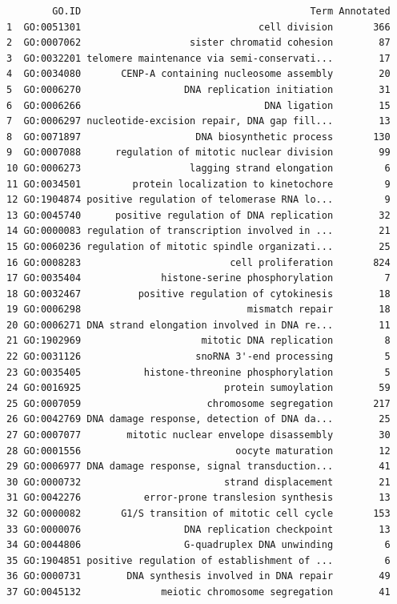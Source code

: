 \documentclass[]{article}
\begin{document}
\begin{verbatim}
        GO.ID                                        Term Annotated
1  GO:0051301                               cell division       366
2  GO:0007062                   sister chromatid cohesion        87
3  GO:0032201 telomere maintenance via semi-conservati...        17
4  GO:0034080       CENP-A containing nucleosome assembly        20
5  GO:0006270                  DNA replication initiation        31
6  GO:0006266                                DNA ligation        15
7  GO:0006297 nucleotide-excision repair, DNA gap fill...        13
8  GO:0071897                    DNA biosynthetic process       130
9  GO:0007088      regulation of mitotic nuclear division        99
10 GO:0006273                   lagging strand elongation         6
11 GO:0034501         protein localization to kinetochore         9
12 GO:1904874 positive regulation of telomerase RNA lo...         9
13 GO:0045740      positive regulation of DNA replication        32
14 GO:0000083 regulation of transcription involved in ...        21
15 GO:0060236 regulation of mitotic spindle organizati...        25
16 GO:0008283                          cell proliferation       824
17 GO:0035404              histone-serine phosphorylation         7
18 GO:0032467          positive regulation of cytokinesis        18
19 GO:0006298                             mismatch repair        18
20 GO:0006271 DNA strand elongation involved in DNA re...        11
21 GO:1902969                     mitotic DNA replication         8
22 GO:0031126                    snoRNA 3'-end processing         5
23 GO:0035405           histone-threonine phosphorylation         5
24 GO:0016925                         protein sumoylation        59
25 GO:0007059                      chromosome segregation       217
26 GO:0042769 DNA damage response, detection of DNA da...        25
27 GO:0007077        mitotic nuclear envelope disassembly        30
28 GO:0001556                           oocyte maturation        12
29 GO:0006977 DNA damage response, signal transduction...        41
30 GO:0000732                         strand displacement        21
31 GO:0042276           error-prone translesion synthesis        13
32 GO:0000082       G1/S transition of mitotic cell cycle       153
33 GO:0000076                  DNA replication checkpoint        13
34 GO:0044806                  G-quadruplex DNA unwinding         6
35 GO:1904851 positive regulation of establishment of ...         6
36 GO:0000731        DNA synthesis involved in DNA repair        49
37 GO:0045132              meiotic chromosome segregation        41

\end{verbatim}
\end{document}
